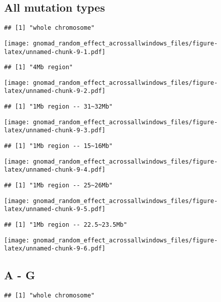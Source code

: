 \documentclass[
]{article}
\begin{document}
\hypertarget{all-mutation-types-1}{%
\subsection{All mutation types}\label{all-mutation-types-1}}

\begin{verbatim}
## [1] "whole chromosome"
\end{verbatim}

\texttt{[image: gnomad\_random\_effect\_acrossallwindows\_files/figure-latex/unnamed-chunk-9-1.pdf]}

\begin{verbatim}
## [1] "4Mb region"
\end{verbatim}

\texttt{[image: gnomad\_random\_effect\_acrossallwindows\_files/figure-latex/unnamed-chunk-9-2.pdf]}

\begin{verbatim}
## [1] "1Mb region -- 31~32Mb"
\end{verbatim}

\texttt{[image: gnomad\_random\_effect\_acrossallwindows\_files/figure-latex/unnamed-chunk-9-3.pdf]}

\begin{verbatim}
## [1] "1Mb region -- 15~16Mb"
\end{verbatim}

\texttt{[image: gnomad\_random\_effect\_acrossallwindows\_files/figure-latex/unnamed-chunk-9-4.pdf]}

\begin{verbatim}
## [1] "1Mb region -- 25~26Mb"
\end{verbatim}

\texttt{[image: gnomad\_random\_effect\_acrossallwindows\_files/figure-latex/unnamed-chunk-9-5.pdf]}

\begin{verbatim}
## [1] "1Mb region -- 22.5~23.5Mb"
\end{verbatim}

\texttt{[image: gnomad\_random\_effect\_acrossallwindows\_files/figure-latex/unnamed-chunk-9-6.pdf]}

\hypertarget{a---g-1}{%
\subsection{A - G}\label{a---g-1}}

\begin{verbatim}
## [1] "whole chromosome"
\end{verbatim}
\end{document}
